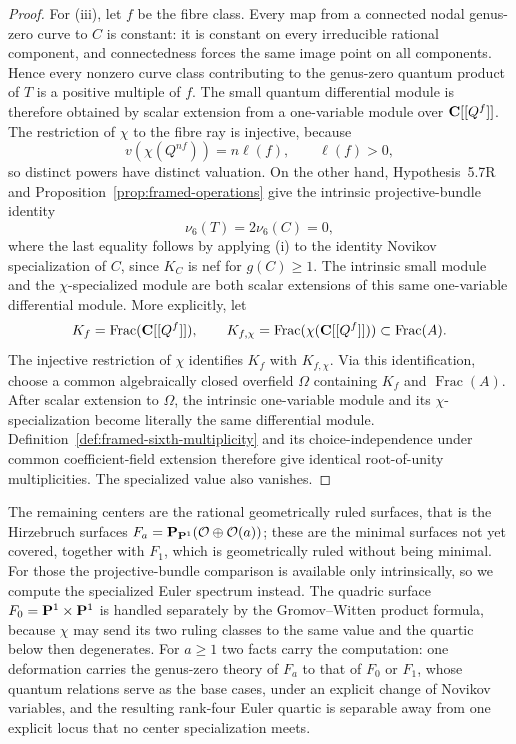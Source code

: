 \begin{proof}
For (iii), let \(f\) be the fibre class.  Every map from a connected
nodal genus-zero curve to \(C\) is constant: it is constant on every
irreducible rational component, and connectedness forces the same image
point on all components.  Hence every nonzero curve class contributing to
the genus-zero quantum product of \(T\) is a positive multiple of \(f\).
The small quantum differential module is therefore obtained by scalar
extension from a one-variable module over \(\mathbf C[[Q^f]]\).  The restriction
of \(\chi\) to the fibre ray is injective, because
\[
 v(\chi(Q^{nf}))=n\ell(f),
 \qquad \ell(f)>0,
\]
so distinct powers have distinct valuation.  On the other hand,
Hypothesis~5.7R and Proposition~\ref{prop:framed-operations} give the
intrinsic projective-bundle identity
\[
 \nu_6(T)=2\nu_6(C)=0,
\]
where the last equality follows by applying (i) to the identity Novikov
specialization of \(C\), since \(K_C\) is nef for \(g(C)\ge1\).
The intrinsic small module and the \(\chi\)-specialized module are both
scalar extensions of this same one-variable differential module.  More
explicitly, let
\[
 K_f=\operatorname{Frac}(\mathbf C[[Q^f]]),
 \qquad
 K_{f,\chi}=\operatorname{Frac}(\chi(\mathbf C[[Q^f]]))
 \subset\operatorname{Frac}(A).
\]
The injective restriction of \(\chi\) identifies \(K_f\) with
\(K_{f,\chi}\).  Via this identification, choose a common algebraically
closed overfield \(\Omega\) containing \(K_f\) and
\(\operatorname{Frac}(A)\).  After scalar extension to \(\Omega\), the
intrinsic one-variable module and its \(\chi\)-specialization become
literally the same differential module.  Definition~\ref{def:framed-sixth-multiplicity} and
its choice-independence under common coefficient-field extension therefore
give identical root-of-unity multiplicities.  The specialized value also
vanishes.
\end{proof}

The remaining centers are the rational geometrically ruled surfaces, that is the
Hirzebruch surfaces \(F_a=\mathbf P_{\mathbf P^1}(\mathcal O\oplus\mathcal O(a))\); these are the minimal
surfaces not yet covered, together with \(F_1\), which is geometrically ruled
without being minimal.  For those the projective-bundle
comparison is available only intrinsically, so we compute the specialized Euler
spectrum instead.  The quadric surface \(F_0=\mathbf P^1\times\mathbf P^1\) is handled
separately by the Gromov--Witten product formula, because \(\chi\) may send its
two ruling classes to the same value and the quartic below then degenerates.  For
\(a\ge1\) two facts carry the computation: one deformation carries the
genus-zero theory of \(F_a\) to that of \(F_0\) or \(F_1\), whose quantum
relations serve as the base cases, under an explicit change of Novikov
variables, and the resulting rank-four Euler quartic is
separable away from one explicit locus that no center specialization meets.

